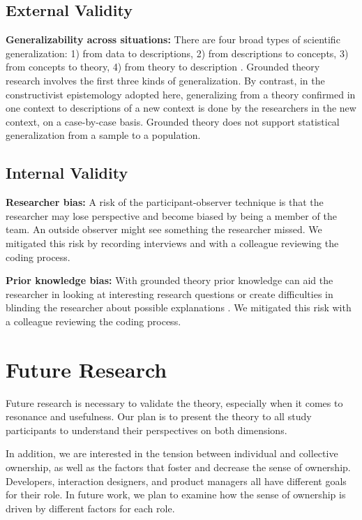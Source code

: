 \begin{table}[]
\subsection{External Validity}

\textbf{Generalizability across situations:} There are four broad types of scientific generalization: 1) from data to descriptions, 2) from descriptions to concepts, 3) from concepts to theory, 4) from theory to description \cite{Lee2003generalizing}. Grounded theory research involves the first three kinds of generalization. By contrast, in the constructivist epistemology adopted here, generalizing from a theory confirmed in one context to descriptions of a new context is done by the researchers in the new context, on a case-by-case basis. Grounded theory does not support statistical generalization from a sample to a population.

\subsection{Internal Validity}
\textbf{Researcher bias:} A risk of the participant-observer technique is that the researcher may lose perspective and become biased by being a member of the team. An outside observer might see something the researcher missed. We mitigated this risk by recording interviews and with a colleague reviewing the coding process.

\textbf{Prior knowledge bias:} With grounded theory prior knowledge can aid the researcher in looking at interesting research questions or create difficulties in blinding the researcher about possible explanations \cite{GlaserIssues}. We mitigated this risk with a colleague reviewing the coding process. 
\section{Future Research}
Future research is necessary to validate the theory, especially when it comes to resonance and usefulness. Our plan is to present the theory to all study participants to understand their perspectives on both dimensions. 

In addition, we are interested in the tension between individual and collective ownership, as well as the factors that foster and decrease the sense of ownership. Developers, interaction designers, and product managers all have different goals for their role. In future work, we plan to examine how the sense of ownership is driven by different factors for each role.


\end{table}
